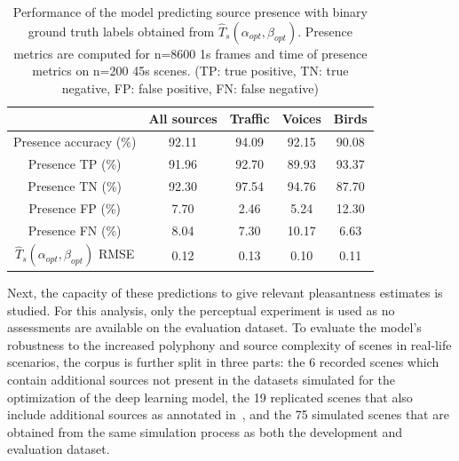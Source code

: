 \documentclass[twocolumn]{article}
\begin{document}
\begin{table}[t]
\centering
\caption{Performance of the model predicting source presence with binary ground truth labels obtained from $\hat T_s(\alpha_{opt}, \beta_{opt})$. Presence metrics are computed for n=8600 1s frames and time of presence metrics on n=200 45s scenes. (TP: true positive, TN: true negative, FP: false positive, FN: false negative)}
\label{tab:perf_cmp}
\begin{tabular}{ c | c | c c c }
\hline
	 & All sources & Traffic & Voices & Birds \\ \hline
	Presence accuracy (\%) &  92.11 & 94.09 & 92.15 & 90.08 \\
	Presence TP (\%) & 91.96 & 92.70 & 89.93 & 93.37 \\
	Presence TN (\%) & 92.30 & 97.54 & 94.76 & 87.70 \\
	Presence FP (\%) & 7.70 & 2.46 & 5.24 & 12.30 \\
	Presence FN (\%) & 8.04 & 7.30 & 10.17 & 6.63 \\ \hline
	$\hat T_s(\alpha_{opt}, \beta_{opt})$ RMSE & 0.12 & 0.13 & 0.10 & 0.11 \\
\end{tabular}
\end{table}

Next, the capacity of these predictions to give relevant pleasantness estimates is studied. For this analysis, only the perceptual experiment is used as no assessments are available on the evaluation dataset. To evaluate the model's robustness to the increased polyphony and source complexity of scenes in real-life scenarios, the corpus is further split in three parts: the 6 recorded scenes which contain additional sources not present in the datasets simulated for the optimization of the deep learning model, the 19 replicated scenes that also include additional sources as annotated in~\cite{gloaguen2017}, and the 75 simulated scenes that are obtained from the same simulation process as both the development and evaluation dataset.
\end{document}
